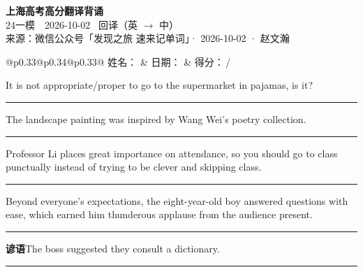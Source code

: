 \documentclass[11pt,a4paper]{article}
\newcommand{\num}[1]{\makebox[1.9em][r]{#1.}\hspace{0.3em}}
\newcommand{\wline}{\noindent\rule{\linewidth}{0.4pt}}
\begin{document}
\pagestyle{plain}
\begin{center}
{\LARGE\bfseries 上海高考高分翻译背诵 }\\[0.25em]
{\large 24一模　2026-10-02 \quad\ 回译（英 $\to$ 中）}\\[0.35em]
{\footnotesize 来源：微信公众号「发现之旅 速来记单词」· 2026-10-02 · 赵文瀚}
\end{center}

\vspace{0.4em}
\noindent\begin{tabular}{@{}p{0.33\textwidth}@{}p{0.34\textwidth}@{}p{0.33\textwidth}@{}}
姓名：\underline{\hspace{2.0cm}} & 日期：\underline{\hspace{2.0cm}} & 得分：\underline{\hspace{1.4cm}}\,/ \\
\end{tabular}

\vspace{0.5em}

\vspace{0.8em}
\num{1}It is not appropriate/proper to go to the supermarket in pajamas, is it?

\vspace{0.25em}

\wline

\num{2}The landscape painting was inspired by Wang Wei’s poetry collection.

\vspace{0.25em}

\wline

\num{3}Professor Li places great importance on attendance, so you should go to class punctually instead of trying to be clever and skipping class.

\vspace{0.25em}

\wline

\num{4}Beyond everyone’s expectations, the eight-year-old boy answered questions with ease, which earned him thunderous applause from the audience present.

\vspace{0.25em}

\wline

\vspace{0.4em}\noindent{\color{rulegray}\rule{\textwidth}{0.6pt}}\vspace{0.4em}

\num{5}\textbf{谚语}\quad The boss suggested they consult a dictionary.

\vspace{0.25em}

\wline
\end{document}
